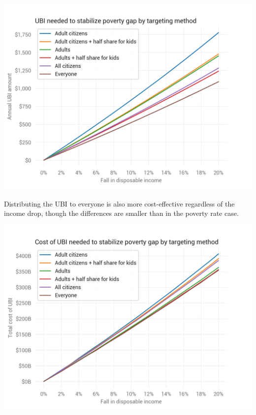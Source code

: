 \documentclass[12pt]{article}
\begin{document}
\begin{center}
\includegraphics[width=15cm]{ubi_pov_gap.png}
\label{fig:ubi_pov_gap}
\end{center}

Distributing the UBI to everyone is also more cost-effective regardless of the income drop, though the differences are smaller than in the poverty rate case.

\begin{center}
\includegraphics[width=15cm]{ubi_cost_pov_gap.png}
\label{fig:ubi_cost_pov_gap}
\end{center}



\clearpage


\end{document}
